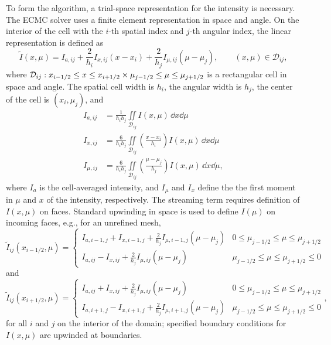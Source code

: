 To form the algorithm, a trial-space representation for the intensity is necessary.  The ECMC solver uses a finite element representation in space and angle. On the
interior of the cell with the $i$-th spatial index and $j$-th angular index, the linear representation is defined as
\begin{equation}\label{eq:ld_intens}
    \tilde I(x,\mu) = I_{a,ij} + \frac{2}{h_i}I_{x,ij}\left(x-x_i\right) +
    \frac{2}{h_j}I_{\mu,ij}\left(\mu-\mu_j\right), \quad \quad (x,\mu) \in
    \mathcal{D}_{ij},
\end{equation}
where $\mathcal{D}_{ij}: x_{{i-1/2}} \leq  x \leq  x_{{i+1/2}} \times \mu_{j-1/2} \leq \mu \leq \mu_{j+1/2}$
is a rectangular cell in space and angle.
The spatial cell width is $h_i$, the angular width is
$h_j$, the center of the cell is $(x_i,\mu_j)$, and
\begin{align}\label{eq:Imoms}
    I_{a,ij} &= \frac{1}{h_i h_j} \iint\limits_{\mathcal{D}_{ij}} I(x,\mu)\, \dd x \dd \mu \\
    I_{x,ij} &= \frac{6}{h_ih_j}\iint\limits_{\mathcal{D}_{ij}} \left(\frac{x - x_i}{h_{i}}\right)
    I(x,\mu)\, \dd x \dd \mu \\ \label{eq:Imoms2}
    I_{\mu,ij} &= \frac{6}{h_ih_j}\iint\limits_{\mathcal{D}_{ij}}
    \left(\frac{\mu - \mu_j}{h_{j}}\right)
    I(x,\mu)\, \dd x \dd \mu,
\end{align} 
where $I_a$ is the cell-averaged intensity, and $I_\mu$ and $I_x$ define the the first
moment in $\mu$ and $x$ of the intensity, respectively.  The streaming term requires
definition of $I(x,\mu)$ on faces.  Standard upwinding in space is
used to define $I(\mu)$ on incoming faces, e.g., for an unrefined mesh,
\begin{equation}\label{eq:left_uw}
    \tilde{I}_{ij}(x_{i-1/2},\mu) = \left \{ \begin{array}{cl}
        I_{a,i-1,j}+I_{x,i-1,j}+\frac{2}{h_j}I_{\mu,i-1,j}\left(\mu-\mu_j\right) & 0 \leq \mu_{j-1/2} \leq \mu \leq \mu_{j+1/2} \\ 
I_{a,ij}-I_{x,ij}+\frac{2}{h_j}I_{\mu,ij}\left(\mu-\mu_j\right) &   \mu_{j-1/2} \leq \mu \leq \mu_{j+1/2} \leq 0
\end{array} \right.
\end{equation}
and
\begin{equation}\label{eq:right_uw}
    \tilde{I}_{ij}(x_{i+1/2},\mu) = \left \{ \begin{array}{cl}
I_{a,ij}+I_{x,ij}+\frac{2}{h_j}I_{\mu,ij}\left(\mu-\mu_j\right)
         & 0 \leq \mu_{j-1/2} \leq \mu \leq \mu_{j+1/2} \\ 
I_{a,i+1,j}-I_{x,i+1,j}+\frac{2}{h_j}I_{\mu,i+1,j}\left(\mu-\mu_j\right)
&   \mu_{j-1/2} \leq \mu \leq \mu_{j+1/2} \leq 0
\end{array} \right. ,
\end{equation}
for all $i$ and $j$ on the interior of the domain; specified boundary conditions for
$I(x,\mu)$ are upwinded at boundaries.
